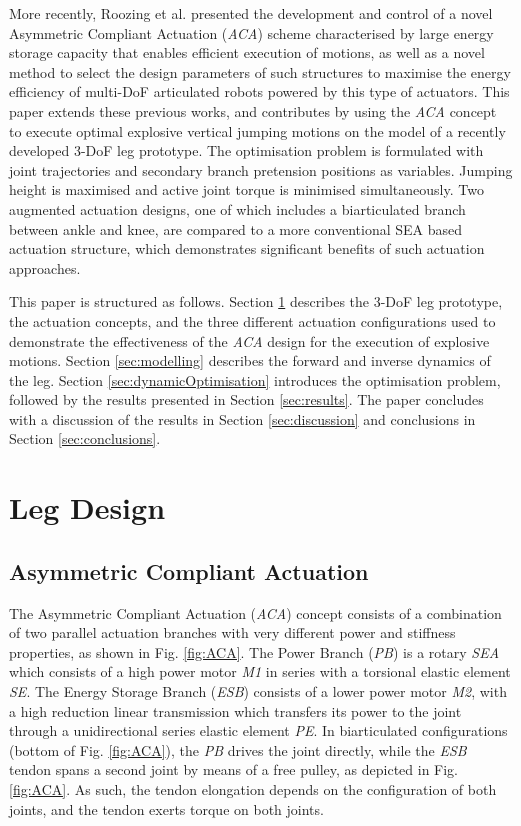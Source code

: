 \documentclass[letterpaper, 10 pt, conference]{ieeeconf}  %
\begin{document}
	More recently, Roozing et al. \cite{roozing2016development, roozing2016design} presented the development and control of a novel Asymmetric Compliant Actuation (\textit{ACA}) scheme characterised by large energy storage capacity that enables efficient execution of motions, as well as a novel method to select the design parameters of such structures to maximise the energy efficiency of multi-DoF articulated robots powered by this type of actuators. This paper extends these previous works, and contributes by using the \textit{ACA} concept to execute optimal explosive vertical jumping motions on the model of a recently developed 3-DoF leg prototype. The optimisation problem is formulated with joint trajectories and secondary branch pretension positions as variables. Jumping height is maximised and active joint torque is minimised simultaneously. Two augmented actuation designs, one of which includes a biarticulated branch between ankle and knee, are compared to a more conventional SEA based actuation structure, which demonstrates significant benefits of such actuation approaches.
	
	This paper is structured as follows. Section \ref{sec:legDesign} describes the 3-DoF leg prototype, the actuation concepts, and the three different actuation configurations used to demonstrate the effectiveness of the \textit{ACA} design for the execution of explosive motions. Section \ref{sec:modelling} describes the forward and inverse dynamics of the leg. Section \ref{sec:dynamicOptimisation} introduces the optimisation problem, followed by the results presented in Section \ref{sec:results}. The paper concludes with a discussion of the results in Section \ref{sec:discussion} and conclusions in Section \ref{sec:conclusions}.
	
	
	\section{Leg Design}
	\label{sec:legDesign}
	
	\subsection{Asymmetric Compliant Actuation}
	\label{subsec:ACA}
	The Asymmetric Compliant Actuation (\textit{ACA}) concept consists of a combination of two parallel actuation branches with very different power and stiffness properties, as shown in Fig. \ref{fig:ACA}. The Power Branch (\textit{PB}) is a rotary \textit{SEA} which consists of a high power motor \textit{M1} in series with a torsional elastic element \textit{SE}. The Energy Storage Branch (\textit{ESB}) consists of a lower power motor \textit{M2}, with a high reduction linear transmission which transfers its power to the joint through a unidirectional series elastic element \textit{PE}. In biarticulated configurations (bottom of Fig. \ref{fig:ACA}), the \textit{PB} drives the joint directly, while the \textit{ESB} tendon spans a second joint by means of a free pulley, as depicted in Fig. \ref{fig:ACA}. As such, the tendon elongation depends on the configuration of both joints, and the tendon exerts torque on both joints.
	
\end{document}
